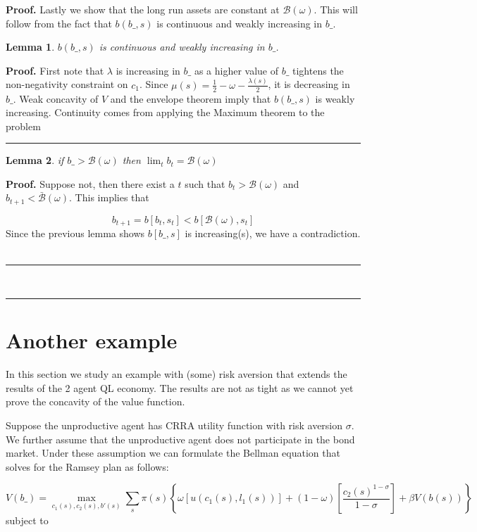\documentclass[thmsb,11pt]{article}
\newtheorem{lemma}{Lemma}
\newenvironment{proof}[1][Proof]{\noindent \textbf{#1.} }{\  \rule{0.5em}{0.5em}}
\begin{document}
\begin{proof}
Lastly we show that the long run assets are constant at ${\mathcal{B}}%
(\omega)$. This will follow from the fact that $b(b\_,s)$ is continuous and weakly increasing in $b\_$.

\begin{lemma}
$b(b\_,s)$ is continuous and weakly increasing in $b\_$.
\end{lemma}

\begin{proof}
First note that $\lambda$ is increasing in $b\_$ as a higher value of $b\_$ tightens the non-negativity constraint on
$c_1$. Since $\mu(s)=\frac{1}{2}-\omega -\frac{\lambda(s)}{2}$, it is
decreasing in $b\_$. Weak concavity of $V$ and the envelope theorem imply that $b(b\_,s)$ is weakly increasing. Continuity comes from
applying the Maximum theorem to the problem
\end{proof}

\begin{lemma}
if $b\_> \mathcal{B}(\omega)$ then $\lim_{t}b_t%
=\mathcal{B} (\omega)$
\end{lemma}

\begin{proof}
Suppose not, then there exist a $t$ such that $b_{t}>\mathcal{B}%
(\omega)$ and $b_{t+1}<\bar{\mathcal{B}}(\omega)$. This
implies that

\begin{equation*}
b_{t+1}=b[b_t,s_t]<b[\mathcal{B}(\omega),s_t]
\end{equation*}
Since the previous lemma shows $b[b\_,s]$ is
increasing(s), we have a contradiction.
\end{proof}

\end{proof}


\section{Another example}
In this section we study an example with (some) risk aversion that extends the results of the 2 agent QL economy. The results are not as tight as we cannot yet prove the concavity of the value function. 

Suppose the unproductive agent has CRRA utility function with risk aversion $\sigma$. We further assume that the unproductive agent does not participate in the bond market. Under these assumption we can formulate the Bellman equation that solves for the Ramsey plan as follows:


\begin{equation}
	\label{eq-QLRA obj}
   	V(b\_)=\max_{c_1(s),c_2(s),b'(s)} \sum_{s}\pi(s)\left\{\omega \left[u(c_1(s),l_1(s))\right]+(1-\omega )\left[\frac{c_2(s)^{1-\sigma}}{1-\sigma}\right]+\beta V(b(s)) \right\}
\end{equation}   
subject to
\end{document}
